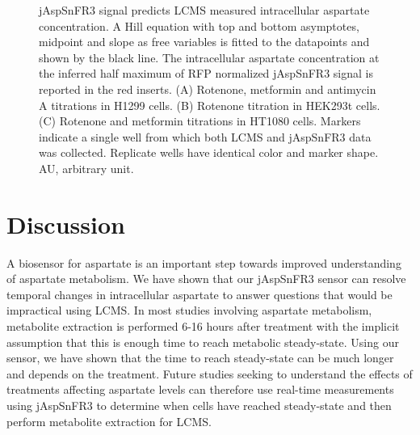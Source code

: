 \begin{figure}[ht!]
\centering
{}
\caption[jAspSnFR3 signal predicts LCMS measured intracellular aspartate concentration.]{
    jAspSnFR3 signal predicts LCMS measured intracellular aspartate concentration.
    A Hill equation with top and bottom asymptotes, midpoint and slope as free variables is fitted to the datapoints and shown by the black line.
    The intracellular aspartate concentration at the inferred half maximum of RFP normalized jAspSnFR3 signal is reported in the red inserts.
    (A) Rotenone, metformin and antimycin A titrations in H1299 cells.
    (B) Rotenone titration in HEK293t cells.
    (C) Rotenone and metformin titrations in HT1080 cells.
    Markers indicate a single well from which both LCMS and jAspSnFR3 data was collected.
    Replicate wells have identical color and marker shape.
    AU, arbitrary unit.
}
\label{ch3:fig:Fig3}
\end{figure}





\section{Discussion}
A biosensor for aspartate is an important step towards improved understanding of aspartate metabolism.
We have shown that our jAspSnFR3 sensor can resolve temporal changes in intracellular aspartate to answer questions that would be impractical using LCMS.
In most studies involving aspartate metabolism, metabolite extraction is performed 6-16 hours after treatment with the implicit assumption that this is enough time to reach metabolic steady-state.
Using our sensor, we have shown that the time to reach steady-state can be much longer and depends on the treatment.
Future studies seeking to understand the effects of treatments affecting aspartate levels can therefore use real-time measurements using jAspSnFR3 to determine when cells have reached steady-state and then perform metabolite extraction for LCMS.

